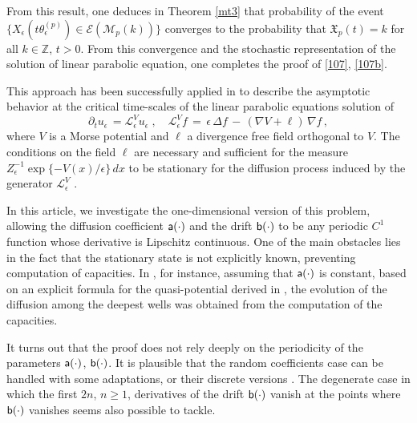 \documentclass[reqno]{amsart}
\theoremstyle{plain}
\theoremstyle{definition}
\newcommand{\mf}[1]{{\mathfrak #1}}
\newcommand{\bb}[1]{{\mathbb #1}}
\newcommand{\ms}[1]{{\mathscr #1}}
\newcommand{\mss}[1]{{\textsf #1}}
\newcounter{as}[section]
\newcommand{\<}{\langle}
\renewcommand{\>}{\rangle}
\begin{document}
From this result, one deduces in Theorem \ref{mt3} that probability
of the event $\{X_\epsilon(t \theta_{\epsilon}^{(p)}) \in \ms E (\ms
M_{p}(k)) \}$  converges to the probability that $\mf X_p(t) =k$ for
all $k\in \bb Z$, $t>0$. From this convergence and the stochastic
representation of the solution of linear parabolic equation, one
completes the proof of \eqref{107}, \eqref{107b}.


This approach has been successfully applied in \cite{lls1, lls2} to
describe the asymptotic behavior at the critical time-scales of the
linear parabolic equations solution of 
\begin{equation*}
\partial_t u_\epsilon \, = \ms L^V_\epsilon u_\epsilon \;,
\quad \ms L^V_\epsilon f \,=\,
\epsilon \, \Delta f \,-\,
(\nabla V + \ell) \, \nabla f\,,
\end{equation*}
where $V$ is a Morse potential and $\ell$ a divergence free field
orthogonal to $V$. The conditions on the field $\ell$ are necessary
and sufficient for the measure $Z_\epsilon^{-1} \exp\{- V(x)/\epsilon\}
\, dx$ to be stationary for the diffusion process induced by the generator
$\ms L^V_\epsilon$ \cite{LS-22}.

In this article, we investigate the one-dimensional version of this
problem, allowing the diffusion coefficient $\mss a(\cdot)$ and the
drift $\mss b(\cdot)$ to be any periodic $C^1$ function whose
derivative is Lipschitz continuous. One of the main obstacles lies in
the fact that the stationary state is not explicitly known, preventing
computation of capacities. In \cite{ls}, for instance, assuming that
$\mss a(\cdot)$ is constant, based on an explicit formula for the
quasi-potential derived in \cite{fg1}, the evolution of the diffusion
among the deepest wells was obtained from the computation of the
capacities.

It turns out that the proof does not rely deeply on the periodicity of
the parameters $\mss a(\cdot)$, $\mss b(\cdot)$. It is plausible that
the random coefficients case \cite{BR86, Chel15} can be handled with
some adaptations, or their discrete versions \cite{BF08}. The
degenerate case in which the first $2n$, $n\ge 1$, derivatives of the
drift $\mss b(\cdot)$ vanish at the points where $\mss b(\cdot)$
vanishes seems also possible to tackle.
\end{document}
